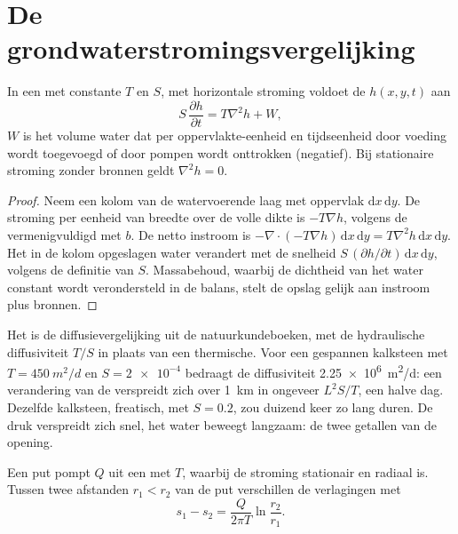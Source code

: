 \section{De grondwaterstromingsvergelijking}\label{sec:b3:hydrogeology:flow-equation}

\begin{theorem}[Grondwaterstromingsvergelijking]\label{thm:b3:hydrogeology:flow-equation}
In een  met constante  $T$ en  $S$,
met horizontale stroming voldoet de  $h(x, y, t)$ aan
\[
S\,\frac{\partial h}{\partial t} = T\nabla^2h + W ,
\]
$W$ is het volume water dat per oppervlakte-eenheid en tijdseenheid door voeding wordt toegevoegd of
door pompen wordt onttrokken (negatief). Bij stationaire stroming zonder bronnen geldt $\nabla^2h =
0$.
\end{theorem}

\begin{proof}
Neem een kolom van de watervoerende laag met oppervlak $\mathrm dx\,\mathrm dy$. De stroming per
eenheid van breedte over de volle dikte is $-T\nabla h$, volgens de 
vermenigvuldigd met $b$. De netto instroom is $-\nabla\cdot(-T\nabla h)\,\mathrm dx\,\mathrm
dy = T\nabla^2h\,\mathrm dx\,\mathrm dy$. Het in de kolom opgeslagen water
verandert met de snelheid $S\,(\partial h/\partial t)\,\mathrm dx\,\mathrm dy$,
volgens de definitie van $S$. Massabehoud, waarbij de dichtheid van het water constant
wordt verondersteld in de balans, stelt de opslag gelijk aan instroom plus bronnen.
\end{proof}

Het is de diffusievergelijking uit de natuurkundeboeken, met de hydraulische
diffusiviteit $T/S$ in plaats van een thermische. Voor een gespannen kalksteen met
$T = \qty{450}{m^2/d}$ en $S = \num{2e-4}$ bedraagt de diffusiviteit
\qty{2.25e6}{m^2/d}: een verandering van de  verspreidt zich over \qty{1}{km} in
ongeveer $L^2S/T$, een halve dag. Dezelfde kalksteen, freatisch, met $S =
0.2$, zou duizend keer zo lang duren. De druk verspreidt zich snel, het water
beweegt langzaam: de twee getallen van de opening.

\begin{proposition}\label{prop:b3:hydrogeology:thiem}
Een put pompt $Q$ uit een  met  $T$, waarbij de
stroming stationair en radiaal is. Tussen twee afstanden $r_1 < r_2$ van de put verschillen de
verlagingen met
\[
s_1 - s_2 = \frac{Q}{2\pi T}\ln\frac{r_2}{r_1} .
\]
\end{proposition}

